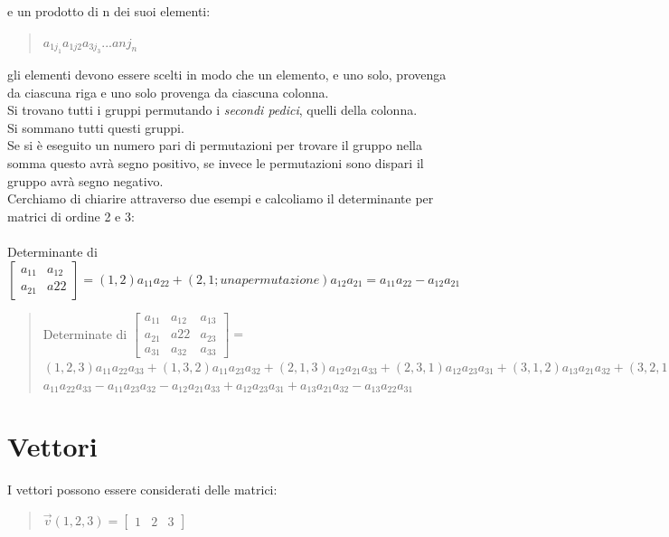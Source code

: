 \documentclass[a4paper]{article}
\begin{document}
e un prodotto di n dei suoi elementi: 
\\\begin{quote} \centering
$a_{1j_{1}} a_{1j{2}} a_{3j_{3}} ... a {nj_{n}}$
\end{quote}
gli elementi devono essere scelti in modo che un elemento, e uno solo, provenga da ciascuna riga e uno solo provenga da ciascuna colonna.
\\ Si trovano tutti i gruppi permutando i \textit{secondi pedici}, quelli della colonna.
\\ Si sommano tutti questi gruppi.
\\ Se si è eseguito un numero pari di permutazioni per trovare il gruppo nella somma questo avrà segno positivo, se invece le permutazioni sono dispari il gruppo avrà segno negativo.
\\ Cerchiamo di chiarire attraverso due esempi e calcoliamo il determinante per matrici di ordine 2 e 3:
\\
\\ Determinante di $\left[\begin{matrix}a_{11} & a_{12} \\ a_{21} & a{22} \end{matrix}\right]
= (1,2) a_{11} a_{22} + (2,1; una permutazione) a_{12}a_{21}= a_{11} a_{22} - a_{12}a_{21}
$
\begin{quote} \centering
Determinate di $\left[\begin{matrix}a_{11} & a_{12} & a_{13} \\ a_{21} & a{22} & a_{23} \\ a_{31} & a_{32} & a_{33} \end{matrix}\right] =$
\bigskip \\ 
$(1,2,3) a_{11}a_{22}a_{33} + (1,3,2) a_{11}a_{23}a_{32} + (2,1,3) a_{12}a_{21}a_{33} + (2,3,1) a_{12}a_{23}a_{31} + (3,1,2) a_{13}a_{21}a_{32} + (3,2,1) a_{13}a_{22}a_{31} = $
\bigskip \\ 
$a_{11}a_{22}a_{33} - a_{11}a_{23}a_{32} - a_{12}a_{21}a_{33} + a_{12}a_{23}a_{31} + a_{13}a_{21}a_{32} - a_{13}a_{22}a_{31} 
$\end{quote}

\section{Vettori}
I vettori possono essere considerati delle matrici:
\\
\begin{quote} \centering
$\vec{v}(1,2,3) =\left[\begin{matrix} 1 & 2 & 3\end{matrix}\right]
$\end{quote}
\end{document}

